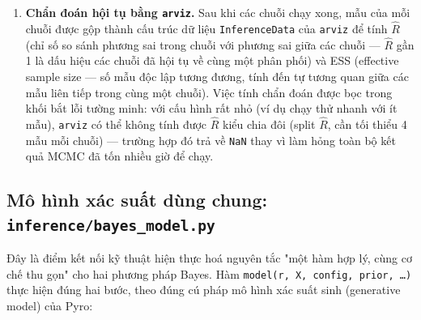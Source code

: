 \documentclass[11pt,a4paper]{article}
\newcommand{\code}[1]{\texttt{#1}}
\newcommand{\file}[1]{\texttt{#1}}
\begin{document}
\begin{enumerate}
    hook (\code{hook\_fn}) được Pyro gọi lại định kỳ (mỗi \code{checkpoint\_moi} vòng
    lặp) để lưu trạng thái hiện tại (giai đoạn, bước tích phân đã thích nghi, giá trị
    tham số tại vòng đó) ra đĩa. Đây là cơ chế phòng ngừa sự cố hệ thống (mất điện,
    khởi động lại ngoài ý muốn) làm mất toàn bộ tiến độ đã chạy --- không phải cơ chế
    tiếp tục chạy hoàn toàn tự động (chuỗi vẫn phải khởi động lại thủ công từ trạng
    thái đã lưu).
  \item \textbf{Chẩn đoán hội tụ bằng \code{arviz}.} Sau khi các chuỗi chạy xong, mẫu
    của mỗi chuỗi được gộp thành cấu trúc dữ liệu \code{InferenceData} của
    \code{arviz} để tính $\hat R$ (chỉ số so sánh phương sai trong chuỗi với phương
    sai giữa các chuỗi --- $\hat R$ gần 1 là dấu hiệu các chuỗi đã hội tụ về cùng một
    phân phối) và ESS (effective sample size --- số mẫu độc lập tương đương, tính đến
    tự tương quan giữa các mẫu liên tiếp trong cùng một chuỗi). Việc tính chẩn đoán
    được bọc trong khối bắt lỗi tường minh: với cấu hình rất nhỏ (ví dụ chạy thử
    nhanh với ít mẫu), \code{arviz} có thể không tính được $\hat R$ kiểu chia đôi
    (split $\hat R$, cần tối thiểu 4 mẫu mỗi chuỗi) --- trường hợp đó trả về
    \code{NaN} thay vì làm hỏng toàn bộ kết quả MCMC đã tốn nhiều giờ để chạy.
\end{enumerate}

\subsection{Mô hình xác suất dùng chung: \file{inference/bayes\_model.py}}
\label{sec:bayes-model}

Đây là điểm kết nối kỹ thuật hiện thực hoá nguyên tắc "một hàm hợp lý, cùng cơ chế
thu gọn" cho hai phương pháp Bayes. Hàm \code{model(r, X, config, prior, \ldots)}
thực hiện đúng hai bước, theo đúng cú pháp mô hình xác suất sinh (generative model)
của Pyro:
\end{document}
